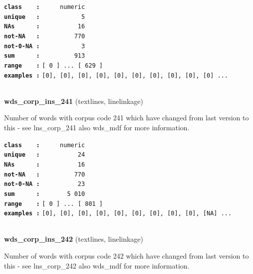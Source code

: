 \documentclass[]{article}
\begin{document}
\textbf{\texttt{class\ \ \ \ :}} \texttt{~~~~~numeric}\\
\textbf{\texttt{unique\ \ \ :}} \texttt{~~~~~~~~~~~5}\\
\textbf{\texttt{NAs\ \ \ \ \ \ :}} \texttt{~~~~~~~~~~16}\\
\textbf{\texttt{not-NA\ \ \ :}} \texttt{~~~~~~~~~770}\\
\textbf{\texttt{not-0-NA\ :}} \texttt{~~~~~~~~~~~3}\\
\textbf{\texttt{sum\ \ \ \ \ \ :}} \texttt{~~~~~~~~~913}\\
\textbf{\texttt{range\ \ \ \ :}}
\texttt{{[}\ 0\ {]}\ ...\ {[}\ 629\ {]}}\\
\textbf{\texttt{examples\ :}}
\texttt{{[}0{]},\ {[}0{]},\ {[}0{]},\ {[}0{]},\ {[}0{]},\ {[}0{]},\ {[}0{]},\ {[}0{]},\ {[}0{]},\ {[}0{]}\ ...}\\

~

\textbf{wds\_corp\_ins\_241} (textlines, linelinkage)

Number of words with corpus code 241 which have changed from last
version to this - see lns\_corp\_241 also wds\_mdf for more information.

\textbf{\texttt{class\ \ \ \ :}} \texttt{~~~~~numeric}\\
\textbf{\texttt{unique\ \ \ :}} \texttt{~~~~~~~~~~24}\\
\textbf{\texttt{NAs\ \ \ \ \ \ :}} \texttt{~~~~~~~~~~16}\\
\textbf{\texttt{not-NA\ \ \ :}} \texttt{~~~~~~~~~770}\\
\textbf{\texttt{not-0-NA\ :}} \texttt{~~~~~~~~~~23}\\
\textbf{\texttt{sum\ \ \ \ \ \ :}} \texttt{~~~~~~~5~010}\\
\textbf{\texttt{range\ \ \ \ :}}
\texttt{{[}\ 0\ {]}\ ...\ {[}\ 801\ {]}}\\
\textbf{\texttt{examples\ :}}
\texttt{{[}0{]},\ {[}0{]},\ {[}0{]},\ {[}0{]},\ {[}0{]},\ {[}0{]},\ {[}0{]},\ {[}0{]},\ {[}0{]},\ {[}NA{]}\ ...}\\

~

\textbf{wds\_corp\_ins\_242} (textlines, linelinkage)

Number of words with corpus code 242 which have changed from last
version to this - see lns\_corp\_242 also wds\_mdf for more information.
\end{document}
